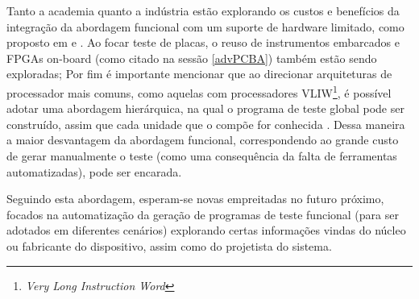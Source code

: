 			Tanto a academia quanto a indústria estão explorando os custos e benefícios da integração da abordagem funcional com um suporte de hardware limitado, como proposto em \citet{bernardi2010exploiting} e \citet{reimann2014advanced}. Ao focar teste de placas, o reuso de instrumentos embarcados e FPGAs on-board (como citado na sessão \ref{advPCBA}) também estão sendo exploradas; 
			Por fim é importante mencionar que ao direcionar arquiteturas de processador mais comuns, como aquelas com processadores VLIW\footnote{\textit{Very Long Instruction Word}}, é possível adotar uma abordagem hierárquica, na qual o programa de teste global pode ser construído, assim que cada unidade que o compõe for conhecida \citep{sabena2012automatic}. Dessa maneira a maior desvantagem da abordagem funcional, correspondendo ao grande custo de gerar manualmente o teste (como uma consequência da falta de ferramentas automatizadas), pode ser encarada.
			
			Seguindo esta abordagem, esperam-se novas empreitadas no futuro próximo, focados na automatização da geração de programas de teste funcional (para ser adotados em diferentes cenários) explorando certas informações vindas do núcleo ou fabricante do dispositivo, assim como do projetista do sistema.
			
			

